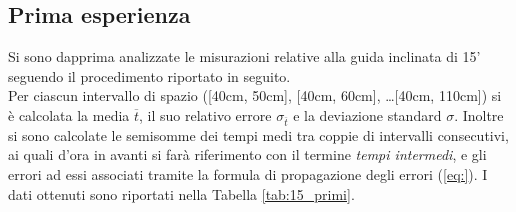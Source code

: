 \documentclass[a4paper,11pt,oneside]{article}
\begin{document}
\subsection{Prima esperienza}
Si sono dapprima analizzate le misurazioni relative alla guida inclinata di 15' seguendo il procedimento riportato in seguito.\\
Per ciascun intervallo di spazio ([40cm, 50cm], [40cm, 60cm], \dots [40cm, 110cm]) si è calcolata  la media $\overline{t}$, il suo relativo errore $\sigma_{\overline{t}}$ e la deviazione standard $\sigma$. Inoltre si sono calcolate le semisomme dei tempi medi tra coppie di intervalli consecutivi, ai quali d'ora in avanti si farà riferimento con il termine \textit{tempi intermedi}, e gli errori ad essi associati tramite la formula di propagazione degli errori (\ref{eq:}).
I dati ottenuti sono riportati nella Tabella \ref{tab:15_primi}.
\end{document}
